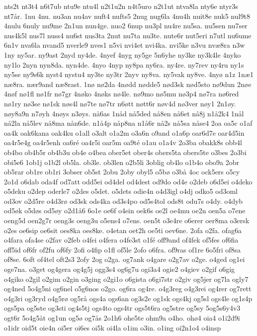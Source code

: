 {nts2t
nt3t4
n6t7ub
ntu9e
ntu4l
n2t1u2n
n4t5uro
n2t1ut
ntva8la
nty6e
ntyr3s
nt7år.
1nu
4nu.
nu3an
nu4av
nuft4
nufts5
2nug
nug6la
4nu4h
nuit8e
nuk5
nul9t8
4nulu
6nuly
nu9me
2n1un
nun4ge.
nuo2
6nup
nu3pl
nu4re
nu5sa.
nu5sen
nu7ser
nus4k5l
nus7l
nuss4
nu6st
nus3ta
2nut
nu7ta
nu3te.
nute6r
nut5eri
n7utl
nu6ume
6n1v
nva6la
nvand5
nverle9
nves1
n5vi
nvi4et
nvi4ka.
nvi5ke
n3vu
nvæ8ra
n3w
1ny
ny5ar.
ny9ast
2nyd
ny4de.
4nyef
4nyg
ny5ge
5n6yhe
ny3ke
ny3k4le
4nyko
ny1lo
2nyn
nyn8da.
nyn4de.
4nyo
4nyp
ny8pa
ny6ra.
ny4re.
ny7rev
ny4ru
ny1s
ny5se
ny9s6k
nyst4
nystu4
ny3te
ny3tr
2nyv
ny8va.
ny5vak
ny8ve.
4nyø
n1z
1næ1
næ8ra.
nær9and
næ8rast.
1nø
nø2da
4nødd
nødde5
nød3sk
nød5sto
nø9dun
2nøe
4nøf
nø1fl
nø1fr
nø7gr
4nøko
4nøks
nø4le.
nø9mo
nø5mu
nø3p4
nø7ra
nø6red
nø1ry
nø3se
nø1sk
nøs4l
nø7te
nø7tr
n6øtt
nøtt6r
nøv4d
nø3ver
nøy1
2n1øy.
nøy8a9n
n7øyh
4nøys
n3øys.
nå6as
1nåd
nå5ded
nå8en
nå6et
nå8j
n1å2k4
1nål
nå2la
nå5lev
nå8ma
nån6de.
n1å4p
nåp8na
n1å6r
nå2s
nå5sa
nåse4
2oa
oa5c
o1af
oa4k
oak6kana
oak4ku
o1all
o3alt
o1a2m
o3a6n
o9and
o1a6p
oar6d7e
oar4d5in
oa4r5e4g
oa4r5enh
oa6ré
oa4r5i
oar5m
oa9té
o1au
o1a4v
2o3ba
obakk8s
obb4l
ob4bo
ob4b5r
ob4b3u
ob4e
o4bea
ober5et
ober4s
obers5ta
obers5te
o3bes
2o3bi
obi5e6
1ob1j
o1b2l
ob5la.
ob3le.
ob3len
o2b5li
3oblig
ob4lo
o1b4o
obo9a
2obr
ob5rar
ob1re
ob1ri
3obser
ob5st
2obu
2oby
obyl5
o5bø
o3bå
4oc
ock5ers
o5cy
2o1d
o6dab
oda4f
od7att
odd5ei
od4del
od4dest
od9do
od4e
o2deb
o6d5ei
o4deko
o5deku
o2dep
oderle7
o2des
o5det.
o5dets
odie4n
o4d3igl
o4dj
odko5
od3oml
od3ov
o2d5re
o4d3rø
od3sk
ods4ka
od3s4po
od5s4tol
ods8t
odu7s
o4dy.
o4dyb
od5øk
o5døs
od5øy
o2d1å6
6o1e
oe6f
o4ein
oek6s
oe2l
oe4mu
oe2n
oen5a
o7ene
oeng5d
oen2g7r
oeng3s
oeng3u
o5ens4
o7ens.
oen5t
o3e4re
o6erer
oer8ma
o3ersk
o2es
oe6sip
oe6sit
oes8ka
oes8ke.
o4etan
oet2h
oe5ti
oev6ne.
2ofa
o2fa.
ofag6a
o4fara
ofa4se
o2fav
o2feb
o4fei
o4fera
o4fe3st
o1fé
off9and
of4fek
of5fes
of6fia
off5id
of6fr
of2fu
of6fy
2ofi
o4fip
o1fl
of5le
2ofo
o6fra.
of9ras
of1re
6o5fri
of8sa
of8se.
6oft
of4tel
oft2s3
2ofy
2og
o2ga.
og7ank
o4gare
o2g7av
o2ge.
o4ged
og1ei
oge7na.
o3get
og4gera
og4g5j
ogg3s4
og6g7u
ogi3a4
ogie2
o4giev
o2gif
o6gig
o4giko
o2gil
o2gim
o2gin
o3ging
o2gi1o
o6gista
o6gi7str
o2giv
og5jer
og7la
ogly7
og4ned
5o4g5ni
og6nel
o5g6nos
o2go.
og6ra
og4re.
o4g3reg
o4g3rei
og4rer
og7rett
o4g3ri
og3ryd
o4g5rø
og5rå
ogs4a
ogs6an
og3s2e
og1sk
ogs4kj
og5sl
ogs4le
og1s4p
ogs5pa
og5ste
og3sti
og4s5tj
ogs4to
ogs4tr
ogs5t6ra
og5stre
og5sy
5og5s6y4v3
ogt6r
5o4g5åt
og1un
og5ø
og7ås
2o1h6
ohe5te
ohm9a
o4ho.
ohø4
oia4
o1i2d9i
o1idr
oid5t
oie4n
oi5er
oi6es
oi5k
oi4la
o1im
o3in.
o1ing
oi2n1o4
o4insp
}
